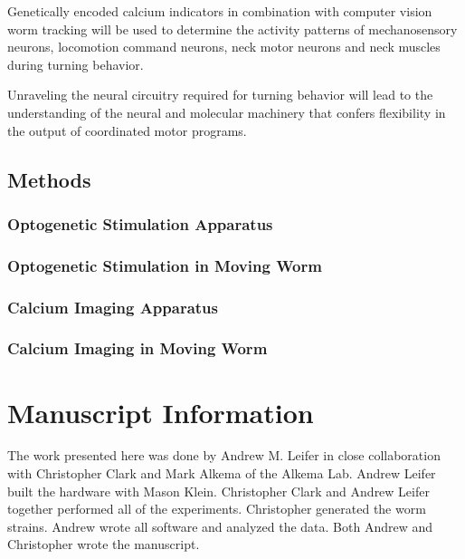 Genetically encoded calcium indicators in combination with  computer vision worm tracking will be used to determine the activity patterns of mechanosensory neurons, locomotion command neurons, neck motor neurons and neck muscles during turning behavior.  

Unraveling the neural circuitry required for turning behavior will lead to the understanding of the neural and molecular machinery that confers flexibility in the output of coordinated motor programs.
\subsection{Methods}


\subsubsection{Optogenetic Stimulation Apparatus}



\subsubsection{Optogenetic Stimulation in Moving Worm}


\subsubsection{Calcium Imaging Apparatus}
\subsubsection{Calcium Imaging in Moving Worm}

\section{Manuscript Information}
The work presented here was done by Andrew M. Leifer in close collaboration with Christopher Clark and Mark Alkema of the Alkema Lab. Andrew Leifer built the hardware with Mason Klein. Christopher Clark and Andrew Leifer together performed all of the experiments. Christopher generated the worm strains. Andrew wrote all software and analyzed the data. Both Andrew and Christopher wrote the manuscript.






